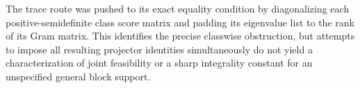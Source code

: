 The trace route was pushed to its exact equality condition by diagonalizing each positive-semidefinite class score matrix and padding its eigenvalue list to the rank of its Gram matrix. This identifies the precise classwise obstruction, but attempts to impose all resulting projector identities simultaneously do not yield a characterization of joint feasibility or a sharp integrality constant for an unspecified general block support.